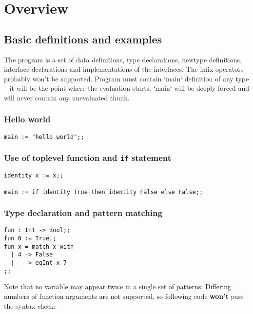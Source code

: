 \documentclass[11pt]{article}
\begin{document}
\section{Overview}
\label{sec:org6e20f71}

\subsection{Basic definitions and examples}
\label{sec:org1d1b6fc}

The program is a set of data definitions, type declarations, newtype definitions, interface declarations and implementations of the interfaces. The infix operators probably won't be supported. Program must contain `main` definition of any type – it will be the point where the evaluation starts. `main` will be deeply forced and will never contain any unevaluated thunk.

\subsubsection{Hello world}
\label{sec:org28dad7b}

\begin{verbatim}
main := "hello world";;
\end{verbatim}

\subsubsection{Use of toplevel function and \texttt{if} statement}
\label{sec:org4dddb03}

\begin{verbatim}
identity x := x;;

main := if identity True then identity False else False;;
\end{verbatim}

\subsubsection{Type declaration and pattern matching}
\label{sec:org21a1421}

\begin{verbatim}
fun : Int -> Bool;;
fun 0 := True;;
fun x = match x with
  | 4 -> False
  | _ -> eqInt x 7
;;
\end{verbatim}

Note that no variable may appear twice in a single set of patterns. Differing numbers of function arguments are not supported, so following code \textbf{\textbf{won't}} pass the syntax check:
\end{document}
